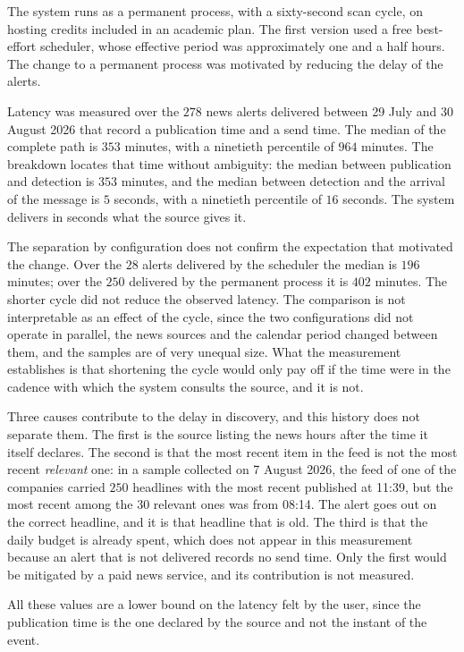 The system runs as a permanent process, with a sixty-second scan cycle, on hosting credits
included in an academic plan. The first version used a free best-effort scheduler, whose effective
period was approximately one and a half hours. The change to a permanent process was motivated by
reducing the delay of the alerts.

Latency was measured over the $278$ news alerts delivered between 29 July and 30 August 2026 that
record a publication time and a send time. The median of the complete path is $353$ minutes, with a
ninetieth percentile of $964$ minutes. The breakdown locates that time without ambiguity: the
median between publication and detection is $353$ minutes, and the median between detection and the
arrival of the message is $5$ seconds, with a ninetieth percentile of $16$ seconds. The system
delivers in seconds what the source gives it.

The separation by configuration does not confirm the expectation that motivated the change. Over
the $28$ alerts delivered by the scheduler the median is $196$ minutes; over the $250$ delivered by
the permanent process it is $402$ minutes. The shorter cycle did not reduce the observed latency.
The comparison is not interpretable as an effect of the cycle, since the two configurations did not
operate in parallel, the news sources and the calendar period changed between them, and the samples
are of very unequal size. What the measurement establishes is that shortening the cycle would only
pay off if the time were in the cadence with which the system consults the source, and it is
not.

Three causes contribute to the delay in discovery, and this history does not separate them. The
first is the source listing the news hours after the time it itself declares. The second is that
the most recent item in the feed is not the most recent \emph{relevant} one: in a sample collected
on 7 August 2026, the feed of one of the companies carried $250$ headlines with the most recent
published at 11:39, but the most recent among the $30$ relevant ones was from 08:14. The alert goes
out on the correct headline, and it is that headline that is old. The third is that the daily
budget is already spent, which does not appear in this measurement because an alert that is not
delivered records no send time. Only the first would be mitigated by a paid news service, and its
contribution is not measured.

All these values are a lower bound on the latency felt by the user, since the publication time is
the one declared by the source and not the instant of the event.

